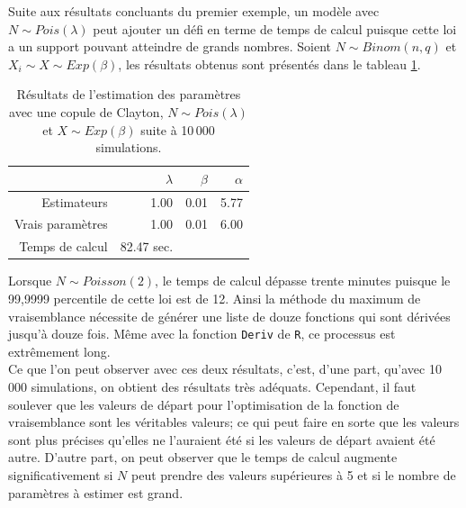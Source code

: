 \documentclass{article}
\begin{document}
	Suite aux résultats concluants du premier exemple, un modèle avec $N \sim Pois(\lambda)$ peut ajouter un défi en terme de temps de calcul puisque cette loi a un support pouvant atteindre de grands nombres. Soient $N \sim Binom(n,q)$ et $X_i \sim X \sim Exp(\beta)$, les résultats obtenus sont présentés dans le tableau \ref{tbl_Clayton_Poisson}.
	
	\begin{table}[H]
		\centering
		\begin{tabular}{rrrr}
			\hline
			& $\lambda$ & $\beta$ & $\alpha$ \\ 
			\hline
			Estimateurs & 1.00 & 0.01 & 5.77 \\ 
			Vrais paramètres & 1.00 & 0.01 & 6.00 \\ 
			\hline
			Temps de calcul & 82.47 sec.\\
			\hline
		\end{tabular}
		\renewcommand{\tablename}{Tableau}
		\caption[Estimations avec une copule de Clayton et $N\sim Poisson$]{Résultats de l'estimation des paramètres avec une copule de Clayton, $N\sim Pois(\lambda)$ et $X \sim Exp(\beta)$ suite à 10\,000 simulations.}\label{tbl_Clayton_Poisson}
	\end{table}

	Lorsque $N \sim Poisson(2)$, le temps de calcul dépasse trente minutes puisque le 99,9999 percentile de cette loi est de 12. Ainsi la méthode du maximum de vraisemblance nécessite de générer une liste de douze fonctions qui sont dérivées jusqu'à douze fois. Même avec la fonction \texttt{Deriv} de \texttt{R}, ce processus est extrêmement long.\\
		
	Ce que l'on peut observer avec ces deux résultats, c'est, d'une part, qu'avec 10\,000 simulations, on obtient des résultats très adéquats. Cependant, il faut soulever que les valeurs de départ pour l'optimisation de la fonction de vraisemblance sont les véritables valeurs; ce qui peut faire en sorte que les valeurs sont plus précises qu'elles ne l'auraient été si les valeurs de départ avaient été autre. D'autre part, on peut observer que le temps de calcul augmente significativement si $N$ peut prendre des valeurs supérieures à 5 et si le nombre de paramètres à estimer est grand.
\end{document}
